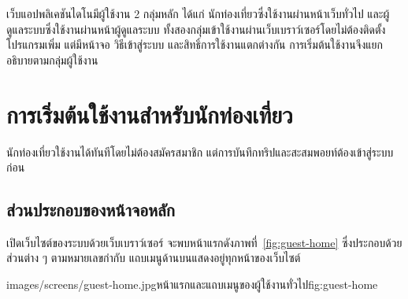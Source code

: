 \label{ch:start}

เว็บแอปพลิเคชันไดโนมีผู้ใช้งาน 2 กลุ่มหลัก ได้แก่ นักท่องเที่ยวซึ่งใช้งานผ่านหน้าเว็บทั่วไป และผู้ดูแลระบบซึ่งใช้งานผ่านหน้าผู้ดูแลระบบ ทั้งสองกลุ่มเข้าใช้งานผ่านเว็บเบราว์เซอร์โดยไม่ต้องติดตั้งโปรแกรมเพิ่ม แต่มีหน้าจอ วิธีเข้าสู่ระบบ และสิทธิ์การใช้งานแตกต่างกัน การเริ่มต้นใช้งานจึงแยกอธิบายตามกลุ่มผู้ใช้งาน

\section{การเริ่มต้นใช้งานสำหรับนักท่องเที่ยว}
\label{sec:start-tourist}

นักท่องเที่ยวใช้งานได้ทันทีโดยไม่ต้องสมัครสมาชิก แต่การบันทึกทริปและสะสมพอยท์ต้องเข้าสู่ระบบก่อน

\subsection{ส่วนประกอบของหน้าจอหลัก}
\label{sec:main-screen}

เปิดเว็บไซต์ของระบบด้วยเว็บเบราว์เซอร์ จะพบหน้าแรกดังภาพที่~\ref{fig:guest-home} ซึ่งประกอบด้วยส่วนต่าง ๆ ตามหมายเลขกำกับ แถบเมนูด้านบนแสดงอยู่ทุกหน้าของเว็บไซต์

\begin{screenshot}{images/screens/guest-home.jpg}{หน้าแรกและแถบเมนูของผู้ใช้งานทั่วไป}{fig:guest-home}
\end{screenshot}

